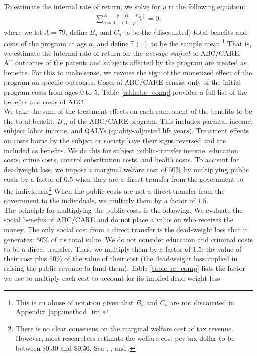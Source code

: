 \noindent To estimate the internal rate of return, we solve for $\rho$ in the following equation:
\begin{align}
\sum_{a=0}^A \frac{ \mathbb{E} (B_a - C_a)}{(1+\rho)^a} = 0,
\end{align}
where we let $A = 79$, define $B_a$ and $C_a$ to be the (discounted) total benefits and costs of the program at age $a$, and define $\mathbb{E}(.)$ to be the sample mean.\footnote{This is an abuse of notation given that $B_a$ and $C_a$ are not discounted in Appendix~\ref{app:method_irr}.} That is, we estimate the internal rate of return for the \textit{average subject} of ABC/CARE. \\

\noindent All outcomes of the parents and subjects affected by the program are treated as benefits. For this to make sense, we reverse the sign of the monetized effect of the program on specific outcomes. Costs of ABC/CARE consist only of the initial program costs from ages 0 to 5. Table \ref{table:bc_comp} provides a full list of the benefits and costs of ABC. \\

\noindent We take the sum of the treatment effects on each component of the benefits to be the total benefit, $B_a$, of the ABC/CARE program. This includes parental income, subject labor income, and QALYs (quality-adjusted life years). Treatment effects on costs borne by the subject or society have their signs reversed and are included as benefits. We do this for subject public-transfer income, education costs, crime costs, control substitution costs, and health costs. To account for deadweight loss, we impose a marginal welfare cost of 50\% by multiplying public costs by a factor of $0.5$ when they are a direct transfer from the government to the individuals\footnote{There is no clear consensus on the marginal welfare cost of tax revenue. However, most researchers estimate the welfare cost per tax dollar to be between \$0.30 and \$0.50. See \citet{Feldstein_1999_REStat}, \citet{Heckman_Smith_1998_evaluating}, and \citet{Browning_1987_AER}.} When the public costs are not a direct transfer from the government to the individuals, we multiply them by a factor of $1.5$.\\

\noindent The principle for multiplying the public costs is the following. We evaluate the social benefits of ABC/CARE and do not place a value on who receives the money. The only social cost from a direct transfer is the dead-weight loss that it generates: $50\%$ of its total value. We do not consider education and criminal costs to be a direct transfer. Thus, we multiply them by a factor of $1.5$: the value of their cost plus $50\%$ of the value of their cost (the dead-weight loss implied in raising the public revenue to fund them). Table \ref{table:bc_comp} lists the factor we use to multiply each cost to account for its implied dead-weight loss.\\

